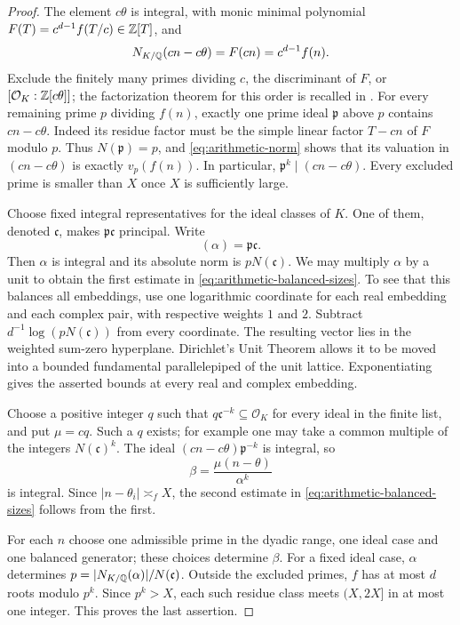\begin{proof}
The element $c\theta$ is integral, with monic minimal polynomial
$F(T)=c^{d-1}f(T/c)\in\mathbb Z[T]$, and
\begin{equation}\label{eq:arithmetic-norm}
 N_{K/\mathbb Q}(cn-c\theta)=F(cn)=c^{d-1}f(n).
\end{equation}
Exclude the finitely many primes dividing $c$, the discriminant of $F$,
or $[\mathcal O_K:\mathbb Z[c\theta]]$; the factorization theorem for
this order is recalled in \cite[Theorem~3.41 and Remark~3.43]{milne2020ant}.
For every remaining prime $p$ dividing
$f(n)$, exactly one prime ideal $\mathfrak p$ above $p$ contains
$cn-c\theta$.  Indeed its residue factor must be the simple linear
factor $T-cn$ of $F$ modulo $p$.  Thus $N(\mathfrak p)=p$, and
\eqref{eq:arithmetic-norm} shows that its valuation in $(cn-c\theta)$
is exactly $v_p(f(n))$.  In particular,
$\mathfrak p^k\mid(cn-c\theta)$.  Every excluded prime is smaller than
$X$ once $X$ is sufficiently large.

Choose fixed integral representatives for the ideal classes of $K$.
One of them, denoted $\mathfrak c$, makes $\mathfrak p\mathfrak c$
principal.  Write
\[
 (\alpha)=\mathfrak p\mathfrak c.
\]
Then $\alpha$ is integral and its absolute norm is $pN(\mathfrak c)$.
We may multiply $\alpha$ by a unit to obtain the first estimate in
\eqref{eq:arithmetic-balanced-sizes}.  To see that this balances all
embeddings, use one logarithmic coordinate for each real embedding and
each complex pair, with respective weights $1$ and $2$.  Subtract
$d^{-1}\log(pN(\mathfrak c))$ from every coordinate.  The resulting
vector lies in the weighted sum-zero hyperplane.  Dirichlet's Unit
Theorem allows it to be moved into a bounded fundamental parallelepiped
of the unit lattice.  Exponentiating gives the asserted bounds at
every real and complex embedding.

Choose a positive integer $q$ such that
$q\mathfrak c^{-k}\subseteq\mathcal O_K$ for every ideal in the finite
list, and put $\mu=cq$.  Such a $q$ exists; for example one may take a
common multiple of the integers $N(\mathfrak c)^k$.  The ideal
$(cn-c\theta)\mathfrak p^{-k}$ is integral, so
\[
 \beta=\frac{\mu(n-\theta)}{\alpha^k}
\]
is integral.  Since $|n-\theta_i|\asymp_f X$, the second estimate in
\eqref{eq:arithmetic-balanced-sizes} follows from the first.

For each $n$ choose one admissible prime in the dyadic range, one ideal
case and one balanced generator; these choices determine $\beta$.
For a fixed ideal case, $\alpha$ determines
$p=|N_{K/\mathbb Q}(\alpha)|/N(\mathfrak c)$.  Outside the excluded primes,
$f$ has at most $d$ roots modulo $p^k$.  Since $p^k>X$, each such
residue class meets $(X,2X]$ in at most one integer.  This proves the
last assertion.
\end{proof}

